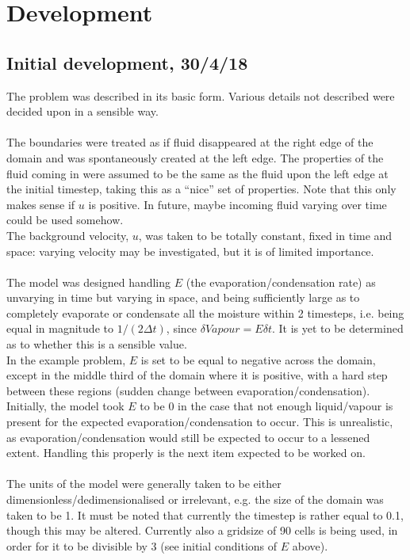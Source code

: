 \documentclass[11pt]{article}
\begin{document}
\section{Development}
\subsection{Initial development, 30/4/18}
The problem was described in its basic form. Various details not described were decided upon in a sensible way. \\
~\\
The boundaries were treated as if fluid disappeared at the right edge of the domain and was spontaneously created at the left edge. The properties of the fluid coming in were assumed to be the same as the fluid upon the left edge at the initial timestep, taking this as a ``nice'' set of properties. Note that this only makes sense if $u$ is positive. In future, maybe incoming fluid varying over time could be used somehow.\\
The background velocity, $u$, was taken to be totally constant, fixed in time and space: varying velocity may be investigated, but it is of limited importance.\\
~\\
The model was designed handling $E$ (the evaporation/condensation rate) as unvarying in time but varying in space, and being sufficiently large as to completely evaporate or condensate all the moisture within 2 timesteps, i.e. being equal in magnitude to $1/(2\Delta t)$, since $\delta Vapour = E \delta t$. It is yet to be determined as to whether this is a sensible value.\\
In the example problem, $E$ is set to be equal to negative across the domain, except in the middle third of the domain where it is positive, with a hard step between these regions (sudden change between evaporation/condensation).\\
Initially, the model took $E$ to be 0 in the case that not enough liquid/vapour is present for the expected evaporation/condensation to occur. This is unrealistic, as evaporation/condensation would still be expected to occur to a lessened extent. Handling this properly is the next item expected to be worked on.\\
~\\
The units of the model were generally taken to be either dimensionless/dedimensionalised or irrelevant, e.g. the size of the domain was taken to be 1. It must be noted that currently the timestep is rather equal to 0.1, though this may be altered. Currently also a gridsize of 90 cells is being used, in order for it to be divisible by 3 (see initial conditions of $E$ above).\\
\end{document}
